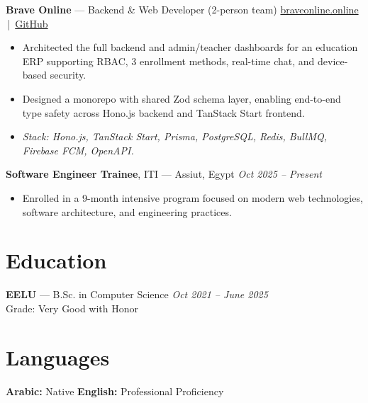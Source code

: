 \documentclass[10pt, letterpaper]{article}
\newenvironment{highlights}{
    \begin{itemize}[
        topsep=0.08cm,
        parsep=0.08cm,
        partopsep=0pt,
        itemsep=0pt,
        leftmargin=10pt
    ]
}{
    \end{itemize}
}
\begin{document}
\vspace{0.15cm}

\textbf{Brave Online} — Backend \& Web Developer (2-person team) \hfill \href{https://braveonline.online}{braveonline.online} \,|\, \href{https://github.com/ahmed-hamada-dev/show-cases/blob/main/braveonlin.online/brave-online-README.md}{GitHub}
\begin{highlights}
    \item Architected the full backend and admin/teacher dashboards for an education ERP supporting RBAC, 3 enrollment methods, real-time chat, and device-based security.
    \item Designed a monorepo with shared Zod schema layer, enabling end-to-end type safety across Hono.js backend and TanStack Start frontend.
    \item \textit{Stack: Hono.js, TanStack Start, Prisma, PostgreSQL, Redis, BullMQ, Firebase FCM, OpenAPI.}
\end{highlights}

\vspace{0.15cm}

\textbf{Software Engineer Trainee}, ITI — Assiut, Egypt \hfill \textit{Oct 2025 -- Present}
\begin{highlights}
    \item Enrolled in a 9-month intensive program focused on modern web technologies, software architecture, and engineering practices.
\end{highlights}


\section{Education}

\textbf{EELU} — B.Sc. in Computer Science \hfill \textit{Oct 2021 -- June 2025} \\
Grade: Very Good with Honor

\section{Languages}

\textbf{Arabic:} Native \hfill
\textbf{English:} Professional Proficiency
\end{document}
